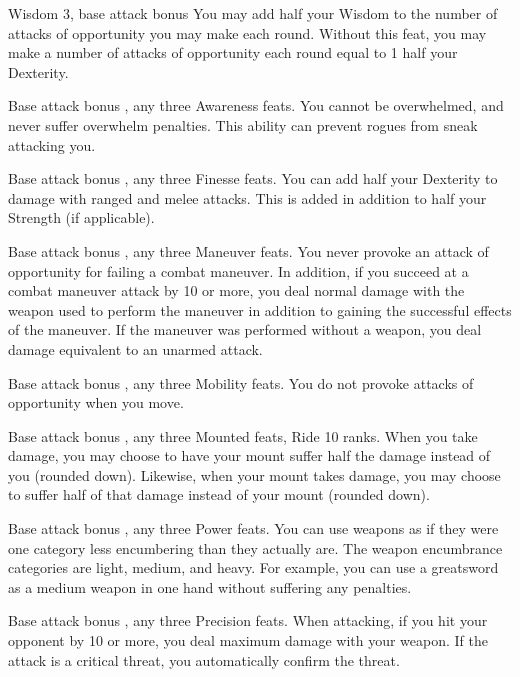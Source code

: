 \featpres Wisdom 3, base attack bonus 
\featben You may add half your Wisdom to the number of attacks of opportunity you may make each round.
 Without this feat, you may make a number of attacks of opportunity each round equal to 1 \add half your Dexterity.

\featpre Base attack bonus , any three Awareness feats.
\featben You cannot be overwhelmed, and never suffer overwhelm penalties. This ability can prevent rogues from sneak attacking you.

\featpre Base attack bonus , any three Finesse feats.
\featben You can add half your Dexterity to damage with ranged and melee attacks. This is added in addition to half your Strength (if applicable).

\featpre Base attack bonus , any three Maneuver feats.
\featben You never provoke an attack of opportunity for failing a combat maneuver. In addition, if you succeed at a combat maneuver attack by 10 or more, you deal normal damage with the weapon used to perform the maneuver in addition to gaining the successful effects of the maneuver. If the maneuver was performed without a weapon, you deal damage equivalent to an unarmed attack.

\featpre Base attack bonus , any three Mobility feats.
\featben You do not provoke attacks of opportunity when you move.

\featpre Base attack bonus , any three Mounted feats, Ride 10 ranks.
\featben When you take damage, you may choose to have your mount suffer half the damage instead of you (rounded down). Likewise, when your mount takes damage, you may choose to suffer half of that damage instead of your mount (rounded down).

\featpres Base attack bonus , any three Power feats.
\featben You can use weapons as if they were one category less encumbering than they actually are. The weapon encumbrance categories are light, medium, and heavy. For example, you can use a greatsword as a medium weapon in one hand without suffering any penalties.

\featpre Base attack bonus , any three Precision feats.
\featben When attacking, if you hit your opponent by 10 or more, you deal maximum damage with your weapon. If the attack is a critical threat, you automatically confirm the threat.

